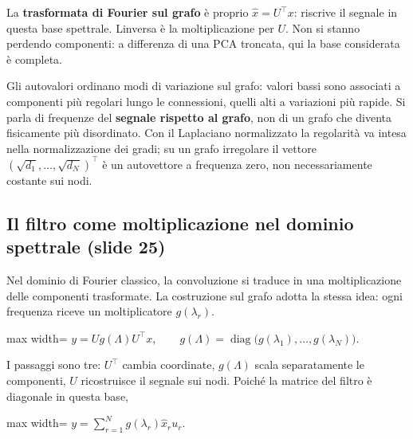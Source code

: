 \documentclass[11pt,a4paper,oneside,openany]{book}
\begin{document}
La \textbf{trasformata di Fourier sul grafo} è proprio \(\widehat x=U^\top x\): riscrive il segnale in questa base spettrale. L\textquotesingle inversa è la moltiplicazione per \(U\). Non si stanno perdendo componenti: a differenza di una PCA troncata, qui la base considerata è completa.

Gli autovalori ordinano modi di variazione sul grafo: valori bassi sono associati a componenti più regolari lungo le connessioni, quelli alti a variazioni più rapide. Si parla di frequenze del \textbf{segnale rispetto al grafo}, non di un grafo che diventa fisicamente più disordinato. Con il Laplaciano normalizzato la regolarità va intesa nella normalizzazione dei gradi; su un grafo irregolare il vettore \((\sqrt{d_1},\ldots,\sqrt{d_N})^\top\) è un autovettore a frequenza zero, non necessariamente costante sui nodi.

\subsection{Il filtro come moltiplicazione nel dominio spettrale (slide 25)}\label{f05-r360}

Nel dominio di Fourier classico, la convoluzione si traduce in una moltiplicazione delle componenti trasformate. La costruzione sul grafo adotta la stessa idea: ogni frequenza riceve un moltiplicatore \(g(\lambda_r)\).

\begin{center}
\begin{adjustbox}{max width=\linewidth}
$\displaystyle \boxed{y=Ug(\Lambda)U^\top x,\qquad
g(\Lambda)=\operatorname{diag}\bigl(g(\lambda_1),\ldots,g(\lambda_N)\bigr).}$
\end{adjustbox}
\end{center}

I passaggi sono tre: \(U^\top\) cambia coordinate, \(g(\Lambda)\) scala separatamente le componenti, \(U\) ricostruisce il segnale sui nodi. Poiché la matrice del filtro è diagonale in questa base,

\begin{center}
\begin{adjustbox}{max width=\linewidth}
$\displaystyle y=\sum_{r=1}^Ng(\lambda_r)\widehat x_ru_r.$
\end{adjustbox}
\end{center}
\end{document}
